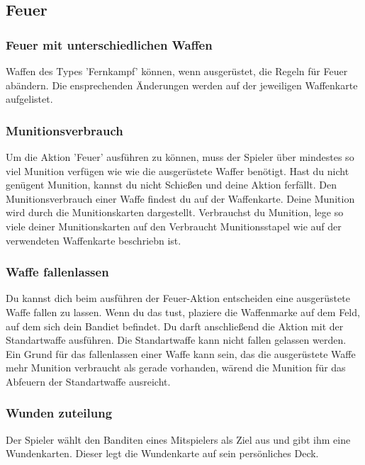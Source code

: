 \subsection{Feuer}

\subsubsection{Feuer mit unterschiedlichen Waffen}
Waffen des Types 'Fernkampf' können, wenn ausgerüstet, die Regeln für Feuer abändern. Die ensprechenden
Änderungen werden auf der jeweiligen Waffenkarte aufgelistet.

\subsubsection{Munitionsverbrauch}
Um die Aktion 'Feuer' ausführen zu können, muss der Spieler über mindestes so viel Munition verfügen wie
wie die ausgerüstete Waffer benötigt. Hast du nicht genügent Munition, kannst du nicht Schießen und deine Aktion ferfällt.
Den Munitionsverbrauch einer Waffe findest du auf der Waffenkarte.
Deine Munition wird durch die Munitionskarten dargestellt. Verbrauchst du Munition, lege so viele deiner Munitionskarten
auf den Verbraucht Munitionsstapel wie auf der verwendeten Waffenkarte beschriebn ist.

\subsubsection{Waffe fallenlassen}
Du kannst dich beim ausführen der Feuer-Aktion entscheiden eine ausgerüstete Waffe fallen zu lassen. Wenn du das tust,
plaziere die Waffenmarke auf dem Feld, auf dem sich dein Bandiet befindet. Du darft anschließend die Aktion mit der
Standartwaffe ausführen. Die Standartwaffe kann nicht fallen gelassen werden. Ein Grund für das fallenlassen einer
Waffe kann sein, das die ausgerüstete Waffe mehr Munition verbraucht als gerade vorhanden, wärend die Munition für
das Abfeuern der Standartwaffe ausreicht.

\subsubsection{Wunden zuteilung}
Der Spieler wählt den Banditen eines Mitspielers als
Ziel aus und gibt ihm eine Wundenkarten. Dieser legt die Wundenkarte auf sein persönliches
Deck.